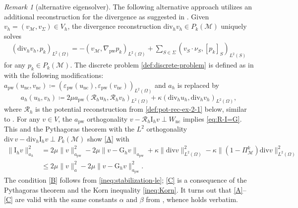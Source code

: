 \documentclass[a4paper]{amsart}
\numberwithin{equation}{section}
\renewcommand{\div}{\mathrm{div}}
\newcommand{\I}{\mathrm{I}}
\newcommand{\Mcal}{\mathcal{M}}
\newcommand{\pw}{\mathrm{pw}}
\theoremstyle{remark}
\newtheorem{remark}[theorem]{Remark}
\theoremstyle{definition}
\theoremstyle{assumptionnoperiod}
\begin{document}
\begin{remark}[alternative eigensolver]\label{rem:alt-eig-le}
	The following alternative approach utilizes an additional reconstruction for the divergence as suggested in \cite{DiPietroErn2015}.
	Given $v_h = (v_\Mcal, v_\Sigma) \in V_h$, the divergence reconstruction $\div_h v_h \in P_k(\Mcal)$ uniquely solves
	\begin{align*}
		(\div_h v_h, p_k)_{L^2(\Omega)} = -(v_\Mcal, \nabla_\pw p_k)_{L^2(\Omega)} + \sum_{S \in \Sigma} (v_S \cdot \nu_S, [p_k]_S)_{L^2(S)}
	\end{align*}
	for any $p_k \in P_k(\Mcal)$. The discrete problem \eqref{def:discrete-problem} is defined as in  with the following modifications:
	$a_\pw(u_\mathrm{nc}, v_\mathrm{nc}) \coloneqq (\varepsilon_\pw(u_\mathrm{nc}), \varepsilon_\pw(v_\mathrm{nc}))_{L^2(\Omega)}$ and
	$a_h$ is replaced by
	$$a_h(u_h,v_h) \coloneqq 2\mu a_\pw(\mathcal{R}_h u_h,\mathcal{R}_h v_h)_{L^2(\Omega)} + \kappa(\div_h u_h, \div_h v_h)_{L^2(\Omega)},$$
	where $\mathcal{R}_h$ is the potential reconstruction from \eqref{def:pot-rec-ex-2-1} below, similar to \cite[Section 3.2]{DiPietroErn2015}.
	For any $v \in V$, the $a_\pw$ orthogonality $v - \mathcal{R}_h \I_h v \perp W_\mathrm{nc}$ \cite[Eq.~(19)]{DiPietroErn2015} implies \eqref{eq:R-I=G}.
	This and
	the Pythagoras theorem with the $L^2$ orthogonality $\div\,v - \div_h \I_h v \perp P_k(\Mcal)$ \cite[Proposition 3]{DiPietroErn2015} show \ref{A} with
	\begin{align*}
		\|\I_h v\|_{a_h}^2 &= 2\mu\|v\|^2_{a_\pw} - 2\mu\|v - \mathrm{G}_h v\|_{a_\pw} + \kappa\|\div v\|^2_{L^2(\Omega)} - \kappa\|(1-\Pi_\Mcal^k)\div v\|_{L^2(\Omega)}^2\\
		&\leq 2\mu\|v\|^2_a - 2\mu\|v-\mathrm{G}_h v\|_{a_\pw}^2.
	\end{align*}
	The condition \ref{B} follows from \eqref{ineq:stabilization-le}; \ref{C} is a consequence of the Pythagoras theorem and the Korn inequality \eqref{ineq:Korn}. It turns out that \ref{A}--\ref{C} are valid with the same constants $\alpha$ and $\beta$ from , whence  holds verbatim.
\end{remark}
\end{document}
